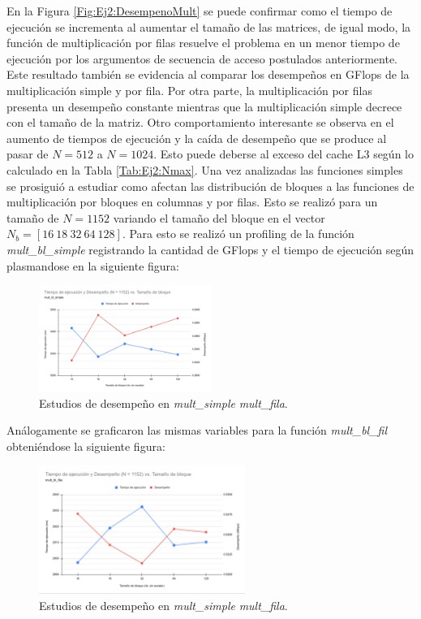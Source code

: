\documentclass[11pt]{article}
\begin{document}
En la Figura \ref{Fig:Ej2:DesempenoMult} se puede confirmar como el tiempo de ejecución se incrementa al aumentar el tamaño de las matrices, de igual modo, la función de multiplicación por filas resuelve el problema en un menor tiempo de ejecución por los argumentos de secuencia de acceso postulados anteriormente. Este resultado también se evidencia al comparar los desempeños en GFlops de la multiplicación simple y por fila. Por otra parte, la multiplicación por filas presenta un desempeño constante mientras que la multiplicación simple decrece con el tamaño de la matriz. Otro comportamiento interesante se observa en el aumento de tiempos de ejecución y la caída de desempeño que se produce al pasar de $N=512$ a $N=1024$. Esto puede deberse al exceso del cache L3 según lo calculado en la Tabla \ref{Tab:Ej2:Nmax}.
\newpage
Una vez analizadas las funciones simples se prosiguió a estudiar como afectan las distribución de bloques a las funciones de multiplicación por bloques en columnas y por filas. Esto se realizó para un tamaño de $N=1152$ variando el tamaño del bloque en el vector $N_b=[16~ 18~ 32~ 64 ~128]$. Para esto se realizó  un profiling de la función \emph{mult\_bl\_simple} registrando la cantidad de GFlops y el tiempo de ejecución según plasmandose en la siguiente figura:

\begin{figure}[hb]
\centering
\includegraphics[width=0.5\textwidth]{tiempoYperformance.mult_bl_simple.png}
\caption{Estudios de desempeño en \emph{mult\_simple} \emph{mult\_fila}.}
\label{Fig:Ej2:DesempenoMultSimpleBloque}
\end{figure}

Análogamente se graficaron las mismas variables para la función \emph{mult\_bl\_fil} obteniéndose la siguiente figura:

\begin{figure}[h]
\centering
\includegraphics[width=0.6\textwidth]{tiempoYperformance.mult_bl_fila.png}
\caption{Estudios de desempeño en \emph{mult\_simple} \emph{mult\_fila}.}
\label{Fig:Ej2:DesempenoMultFilaBloque}
\end{figure}
\end{document}

